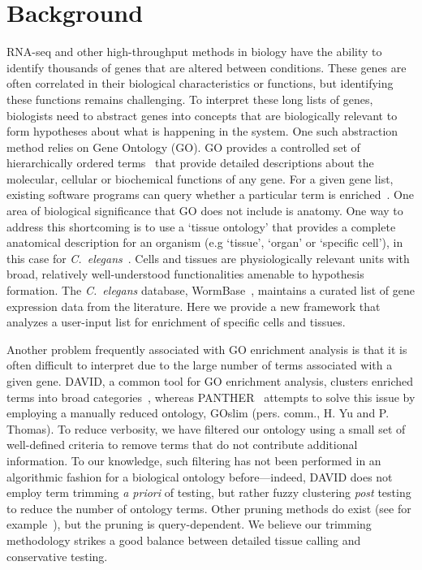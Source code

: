\documentclass{bmcart}
\begin{document}
\section*{Background}
	RNA-seq and other high-throughput methods in biology have the ability to identify thousands of genes that are altered between conditions. These genes are often correlated in their biological characteristics or functions, but identifying these functions remains challenging. To interpret these long lists of genes, biologists need to abstract genes into concepts that are biologically relevant to form hypotheses about what is happening in the system. One such abstraction method relies on Gene Ontology (GO). GO provides a controlled set of hierarchically ordered terms~\cite{TheGeneOntologyConsortium2000a, TheGeneOntologyConsortium2015} that provide detailed descriptions about the molecular, cellular or biochemical functions of any gene. For a given gene list, existing software programs can query whether a particular term is enriched~\cite{Mi2009, McLean2010, Huang2009}. One area of biological significance that GO does not include is anatomy. One way to address this shortcoming is to use a `tissue ontology' that provides a complete anatomical description for an organism (e.g `tissue', `organ' or `specific cell'), in this case for \emph{C.~elegans}~\cite{Lee2003}. Cells and tissues are physiologically relevant units with broad, relatively well-understood functionalities amenable to hypothesis formation. The \emph{C.~elegans} database, WormBase~\cite{Howe2016}, maintains a curated list of gene expression data from the literature. Here we provide a new framework that analyzes a user-input list for enrichment of specific cells and tissues. %

Another problem frequently associated with GO enrichment analysis is that it is often difficult to interpret due to the large number of terms associated with a given gene. %
DAVID, a common tool for GO enrichment analysis, clusters enriched terms into broad categories~\cite{Huang2007}, whereas PANTHER~\cite{Mi2009, Mi2013} attempts to solve this issue by employing a manually reduced ontology, GOslim (pers. comm., H. Yu and P. Thomas). To reduce verbosity, we have filtered our ontology using a small set of well-defined criteria to remove terms that do not contribute additional information. To our knowledge, such filtering has not been performed in an algorithmic fashion for a biological ontology before---indeed, DAVID does not employ term trimming \emph{a priori} of testing, but rather fuzzy clustering \emph{post} testing to reduce the number of ontology terms. Other pruning methods do exist (see for example~\cite{Kim2007}), but the pruning is query-dependent. We believe our trimming methodology strikes a good balance between detailed tissue calling and conservative testing.
\end{document}
